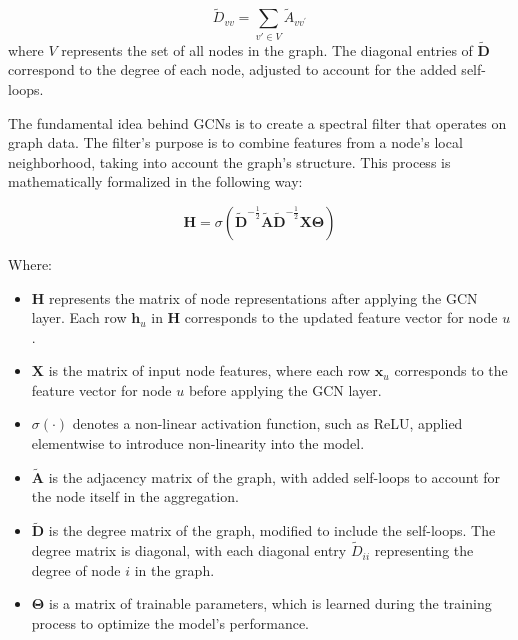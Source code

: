 \begin{equation}
    \tilde{D}_{vv} = \sum_{{v'} \in V} \tilde{A}_{vv^{'}}   
    \label{eq:degree_matrix}
\end{equation}
%
where \( V \) represents the set of all nodes in the graph. The diagonal entries of \( \tilde{\mathbf{D}} \) correspond to the degree of each node, adjusted to account for the added self-loops.




The fundamental idea behind GCNs is to create a spectral filter that operates on graph data. The filter's purpose is to combine features from a node's local neighborhood, taking into account the graph's structure. This process is mathematically formalized in the following way:

\begin{equation}
 \mathbf{H} = \sigma\left( \tilde{\mathbf{D}}^{-\frac{1}{2}} \tilde{\mathbf{A}} \tilde{\mathbf{D}}^{-\frac{1}{2}} \mathbf{X} \mathbf{\Theta} \right)   
    \label{eq:GCN_filter}
\end{equation}

Where:
\begin{itemize}
    \item \( \mathbf{H} \) represents the matrix of node representations after applying the GCN layer. Each row \( \mathbf{h}_u \) in \( \mathbf{H} \) corresponds to the updated feature vector for node \( u \). 
    \item \( \mathbf{X} \) is the matrix of input node features, where each row \( \mathbf{x}_u \) corresponds to the feature vector for node \( u \) before applying the GCN layer. 
    \item \( \sigma(\cdot) \) denotes a non-linear activation function, such as ReLU, applied elementwise to introduce non-linearity into the model. 
    \item \( \tilde{\mathbf{A}} \) is the adjacency matrix of the graph, with added self-loops to account for the node itself in the aggregation. 
    \item \( \tilde{\mathbf{D}} \) is the degree matrix of the graph, modified to include the self-loops. The degree matrix is diagonal, with each diagonal entry \( \tilde{D}_{ii} \) representing the degree of node \( i \) in the graph. 
    \item \( \mathbf{\Theta} \) is a matrix of trainable parameters, which is learned during the training process to optimize the model's performance.


\end{itemize}

